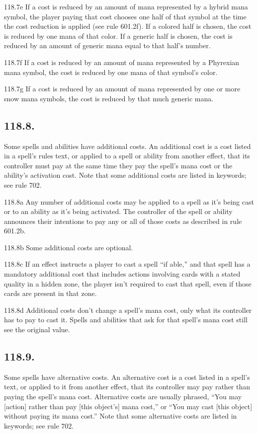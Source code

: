 118.7e If a cost is reduced by an amount of mana represented by a hybrid mana symbol, the player paying that cost chooses one half of that symbol at the time the cost reduction is applied (see rule 601.2f). If a colored half is chosen, the cost is reduced by one mana of that color. If a generic half is chosen, the cost is reduced by an amount of generic mana equal to that half’s number.

118.7f If a cost is reduced by an amount of mana represented by a Phyrexian mana symbol, the cost is reduced by one mana of that symbol’s color.

118.7g If a cost is reduced by an amount of mana represented by one or more snow mana symbols, the cost is reduced by that much generic mana.

\subsection*{118.8.}
Some spells and abilities have additional costs. An additional cost is a cost listed in a spell’s rules text, or applied to a spell or ability from another effect, that its controller must pay at the same time they pay the spell’s mana cost or the ability’s activation cost. Note that some additional costs are listed in keywords; see rule 702.

118.8a Any number of additional costs may be applied to a spell as it’s being cast or to an ability as it’s being activated. The controller of the spell or ability announces their intentions to pay any or all of those costs as described in rule 601.2b.

118.8b Some additional costs are optional.

118.8c If an effect instructs a player to cast a spell “if able,” and that spell has a mandatory additional cost that includes actions involving cards with a stated quality in a hidden zone, the player isn’t required to cast that spell, even if those cards are present in that zone.

118.8d Additional costs don’t change a spell’s mana cost, only what its controller has to pay to cast it. Spells and abilities that ask for that spell’s mana cost still see the original value.

\subsection*{118.9.}
Some spells have alternative costs. An alternative cost is a cost listed in a spell’s text, or applied to it from another effect, that its controller may pay rather than paying the spell’s mana cost. Alternative costs are usually phrased, “You may [action] rather than pay [this object’s] mana cost,” or “You may cast [this object] without paying its mana cost.” Note that some alternative costs are listed in keywords; see rule 702.

